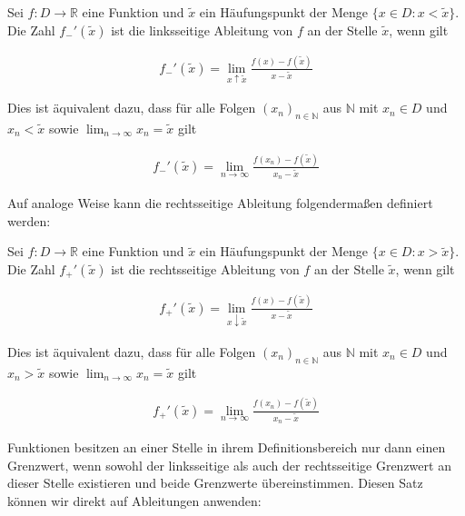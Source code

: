 \documentclass[fontsize=9pt,
               parskip=half-,
               DIV=14,
               listof=chapterentry,
               tocflat]{scrbook}
\begin{document}
\begin{definition*}
Sei $f:D\to \mathbb {R} $ eine Funktion und ${\tilde {x}}$ ein Häufungspunkt der Menge $\{x\in D:x<{\tilde {x}}\}$. Die Zahl ${f_{-}}'({\tilde {x}})$ ist die linksseitige Ableitung von $f$ an der Stelle ${\tilde {x}}$, wenn gilt

\begin{align*}
{f_{-}}'({\tilde {x}})=\lim _{x\uparrow {\tilde {x}}}{\frac {f(x)-f({\tilde {x}})}{x-{\tilde {x}}}}
\end{align*}

Dies ist äquivalent dazu, dass für alle Folgen $(x_{n})_{n\in \mathbb {N} }$ aus $\mathbb {N} $ mit $x_{n}\in D$ und $x_{n}<{\tilde {x}}$ sowie $\lim _{n\to \infty }x_{n}={\tilde {x}}$ gilt

\begin{align*}
{f_{-}}'({\tilde {x}})=\lim _{n\to \infty }{\frac {f(x_{n})-f({\tilde {x}})}{x_{n}-{\tilde {x}}}}
\end{align*}

\end{definition*}

Auf analoge Weise kann die rechtsseitige Ableitung folgendermaßen definiert werden:

\begin{definition*}
Sei $f:D\to \mathbb {R} $ eine Funktion und ${\tilde {x}}$ ein Häufungspunkt der Menge $\{x\in D:x>{\tilde {x}}\}$. Die Zahl ${f_{+}}'({\tilde {x}})$ ist die rechtsseitige Ableitung von $f$ an der Stelle ${\tilde {x}}$, wenn gilt

\begin{align*}
{f_{+}}'({\tilde {x}})=\lim _{x\downarrow {\tilde {x}}}{\frac {f(x)-f({\tilde {x}})}{x-{\tilde {x}}}}
\end{align*}

Dies ist äquivalent dazu, dass für alle Folgen $(x_{n})_{n\in \mathbb {N} }$ aus $\mathbb {N} $ mit $x_{n}\in D$ und $x_{n}>{\tilde {x}}$ sowie $\lim _{n\to \infty }x_{n}={\tilde {x}}$ gilt

\begin{align*}
{f_{+}}'({\tilde {x}})=\lim _{n\to \infty }{\frac {f(x_{n})-f({\tilde {x}})}{x_{n}-{\tilde {x}}}}
\end{align*}

\end{definition*}

Funktionen besitzen an einer Stelle in ihrem Definitionsbereich nur dann einen Grenzwert, wenn sowohl der linksseitige als auch der rechtsseitige Grenzwert an dieser Stelle existieren und beide Grenzwerte übereinstimmen. Diesen Satz können wir direkt auf Ableitungen anwenden:
\end{document}
